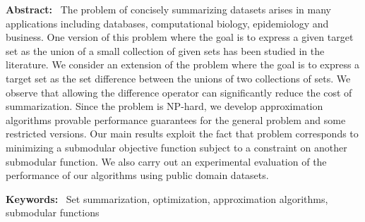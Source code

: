 \noindent
\textbf{Abstract:}~
 The problem of concisely summarizing datasets arises in many
applications including databases, computational biology, epidemiology
and business. One version of this problem where the goal is to
express a given target set  as the union of a small collection of
given sets has been studied in the literature.  We consider an
extension of the problem where the goal is to express a target set
as the set difference between the unions of two collections of sets.
We observe that allowing the difference operator can significantly
reduce the cost of summarization. Since the problem is NP-hard, we
develop approximation algorithms provable performance guarantees
for the general problem and some restricted versions. Our main
results exploit the fact that problem corresponds to minimizing a
submodular objective function subject to a constraint on another
submodular function. We also carry out an experimental evaluation
of the performance of our algorithms using public domain datasets.

\noindent
\textbf{Keywords:}~ Set summarization, optimization, approximation algorithms, submodular functions
